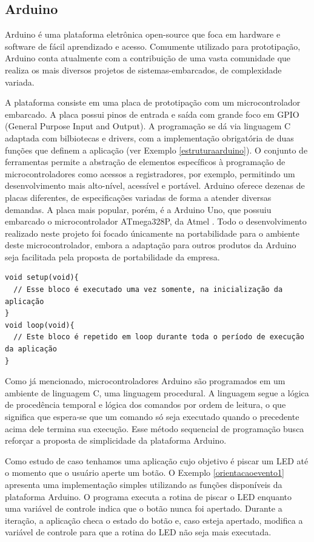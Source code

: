 \documentclass[11pt]{article}
\begin{document}
\subsection{Arduino}
\tab Arduino é uma plataforma eletrônica open-source que foca em hardware e software de fácil aprendizado e acesso. Comumente utilizado para prototipação, Arduino conta atualmente com a contribuição de uma vasta comunidade que realiza os mais diversos projetos de sistemas-embarcados, de complexidade variada.\cite{arduinoblog}
\par A plataforma consiste em uma placa de prototipação com um microcontrolador embarcado. A placa possui pinos de entrada e saída com grande foco em GPIO (General Purpose Input and Output). A programação se dá via linguagem C adaptada com bilbiotecas e drivers, com a implementação obrigatória de duas funções que definem a aplicação (ver Exemplo \ref{estruturaarduino}). O conjunto de ferramentas permite a abstração de elementos específicos à programação de microcontroladores como acessos a registradores, por exemplo, permitindo um desenvolvimento mais alto-nível, acessível e portável. Arduino oferece dezenas de placas diferentes, de especificações variadas de forma a atender diversas demandas. A placa mais popular, porém, é a Arduino Uno, que possuiu embarcado o microcontrolador ATmega328P, da Atmel \cite{atmegadatasheet}. Todo o desenvolvimento realizado neste projeto foi focado únicamente na portabilidade para o ambiente deste microcontrolador, embora a adaptação para outros produtos da Arduino seja facilitada pela proposta de portabilidade da empresa.
\begin{lstlisting}[style=CStyle,label=estruturaarduino,caption=Estrutura de uma aplicação Arduino]
void setup(void){
  // Esse bloco é executado uma vez somente, na inicialização da aplicação
}
void loop(void){
  // Este bloco é repetido em loop durante toda o período de execução da aplicação
}
\end{lstlisting}
\par Como já mencionado, microcontroladores Arduino são programados em um ambiente de linguagem C, uma linguagem procedural. A linguagem segue a lógica de procedência temporal e lógica dos comandos por ordem de leitura, o que significa que espera-se que um comando só seja executado quando o precedente acima dele termina sua execução. Esse método sequencial de programação busca reforçar a proposta de simplicidade da plataforma Arduino. 
\par Como estudo de caso tenhamos uma aplicação cujo objetivo é piscar um LED até o momento que o usuário aperte um botão. O Exemplo \ref{orientacaoevento1} apresenta uma implementação simples utilizando as funções disponíveis da plataforma Arduino. O programa executa a rotina de piscar o LED enquanto uma variável de controle indica que o botão nunca foi apertado. Durante a iteração, a aplicação checa o estado do botão e, caso esteja apertado, modifica a variável de controle para que a rotina do LED não seja mais executada.
\end{document}
